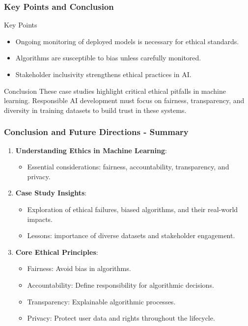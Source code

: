 \documentclass[aspectratio=169]{beamer}
\begin{document}
\begin{frame}[fragile]
    \frametitle{Key Points and Conclusion}
    \begin{block}{Key Points}
        \begin{itemize}
            \item Ongoing monitoring of deployed models is necessary for ethical standards.
            \item Algorithms are susceptible to bias unless carefully monitored.
            \item Stakeholder inclusivity strengthens ethical practices in AI.
        \end{itemize}
    \end{block}

    \begin{block}{Conclusion}
        These case studies highlight critical ethical pitfalls in machine learning. Responsible AI development must focus on fairness, transparency, and diversity in training datasets to build trust in these systems.
    \end{block}
\end{frame}

\begin{frame}[fragile]
    \frametitle{Conclusion and Future Directions - Summary}
    \begin{enumerate}
        \item \textbf{Understanding Ethics in Machine Learning}:
        \begin{itemize}
            \item Essential considerations: fairness, accountability, transparency, and privacy.
        \end{itemize}

        \item \textbf{Case Study Insights}:
        \begin{itemize}
            \item Exploration of ethical failures, biased algorithms, and their real-world impacts.
            \item Lessons: importance of diverse datasets and stakeholder engagement.
        \end{itemize}

        \item \textbf{Core Ethical Principles}:
        \begin{itemize}
            \item Fairness: Avoid bias in algorithms.
            \item Accountability: Define responsibility for algorithmic decisions.
            \item Transparency: Explainable algorithmic processes.
            \item Privacy: Protect user data and rights throughout the lifecycle.
        \end{itemize}
    \end{enumerate}
\end{frame}
\end{document}
